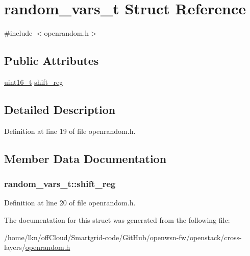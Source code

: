 \hypertarget{structrandom__vars__t}{}\section{random\+\_\+vars\+\_\+t Struct Reference}
\label{structrandom__vars__t}


{\ttfamily \#include $<$openrandom.\+h$>$}

\subsection*{Public Attributes}
\begin{DoxyCompactItemize}
\item 
\hyperlink{_p_e___types_8h_a1f1825b69244eb3ad2c7165ddc99c956}{uint16\+\_\+t} \hyperlink{structrandom__vars__t_af5c1202bd3bfa0955f93e3e5f374ff89}{shift\+\_\+reg}
\end{DoxyCompactItemize}


\subsection{Detailed Description}


Definition at line 19 of file openrandom.\+h.



\subsection{Member Data Documentation}
\subsubsection[{\texorpdfstring{shift\+\_\+reg}{shift_reg}}]{ random\+\_\+vars\+\_\+t\+::shift\+\_\+reg}\hypertarget{structrandom__vars__t_af5c1202bd3bfa0955f93e3e5f374ff89}{}\label{structrandom__vars__t_af5c1202bd3bfa0955f93e3e5f374ff89}


Definition at line 20 of file openrandom.\+h.



The documentation for this struct was generated from the following file\+:\begin{DoxyCompactItemize}
\item 
/home/lkn/off\+Cloud/\+Smartgrid-\/code/\+Git\+Hub/openwsn-\/fw/openstack/cross-\/layers/\hyperlink{openrandom_8h}{openrandom.\+h}\end{DoxyCompactItemize}
